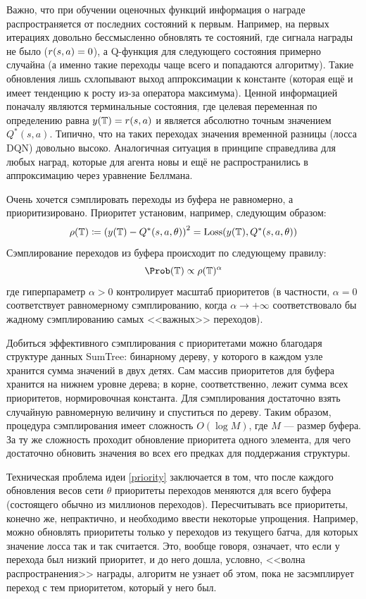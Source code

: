 Важно, что при обучении оценочных функций информация о награде распространяется от последних состояний к первым. Например, на первых итерациях довольно бессмысленно обновлять те состояний, где сигнала награды не было ($r(s, a) \HM= 0$), а Q-функция для следующего состояния примерно случайна (а именно такие переходы чаще всего и попадаются алгоритму). Такие обновления лишь схлопывают выход аппроксимации к константе (которая ещё и имеет тенденцию к росту из-за оператора максимума). Ценной информацией поначалу являются терминальные состояния, где целевая переменная по определению равна $y(\mathbb{T} ) = r(s, a)$ и является абсолютно точным значением $Q^*(s, a)$. Типично, что на таких переходах значения временной разницы (лосса DQN) довольно высоко. Аналогичная ситуация в принципе справедлива для любых наград, которые для агента новы и ещё не распространились в аппроксимацию через уравнение Беллмана.

Очень хочется сэмплировать переходы из буфера не равномерно, а приоритизировано. Приоритет установим, например, следующим образом:
\begin{equation}\label{priority}
    \rho(\mathbb{T} ) \coloneqq \left( y(\mathbb{T} ) - Q^*(s, a, \theta) \right)^2 = \operatorname{Loss}(y(\mathbb{T} ), Q^*(s, a, \theta))
\end{equation}
Сэмплирование переходов из буфера происходит по следующему правилу:
$$\Prob ( \T ) \propto \rho( \T )^\alpha$$
где гиперпараметр $\alpha > 0$ контролирует масштаб приоритетов (в частности, $\alpha = 0$ соответствует равномерному сэмплированию, когда $\alpha \to +\infty$ соответствовало бы жадному сэмплированию самых <<важных>> переходов).

\begin{remark}
Добиться эффективного сэмплирования с приоритетами можно благодаря структуре данных SumTree: бинарному дереву, у которого в каждом узле хранится сумма значений в двух детях. Сам массив приоритетов для буфера хранится на нижнем уровне дерева; в корне, соответственно, лежит сумма всех приоритетов, нормировочная константа. Для сэмплирования достаточно взять случайную равномерную величину и спуститься по дереву. Таким образом, процедура сэмплирования имеет сложность $O(\log M)$, где $M$ --- размер буфера. За ту же сложность проходит обновление приоритета одного элемента, для чего достаточно обновить значения во всех его предках для поддержания структуры.
\end{remark}

Техническая проблема идеи \eqref{priority} заключается в том, что после каждого обновления весов сети $\theta$ приоритеты переходов меняются для всего буфера (состоящего обычно из миллионов переходов). Пересчитывать все приоритеты, конечно же, непрактично, и необходимо ввести некоторые упрощения. Например, можно обновлять приоритеты только у переходов из текущего батча, для которых значение лосса так и так считается. Это, вообще говоря, означает, что если у перехода был низкий приоритет, и до него дошла, условно, <<волна распространения>> награды, алгоритм не узнает об этом, пока не засэмплирует переход с тем приоритетом, который у него был.

